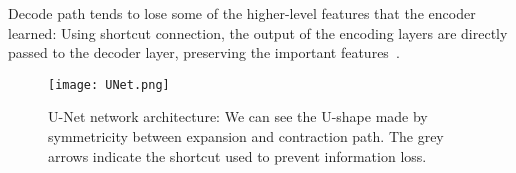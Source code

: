 \documentclass{standalone}
\begin{document}
	Decode path tends to lose some of the higher-level features that the encoder learned: Using shortcut connection, the output of the encoding layers are directly passed to the decoder layer, preserving the important features~\cite{PhDtheis}.
		
	\begin{figure}[h!]
		\centering
			\texttt{[image: UNet.png]}
		\caption{U-Net network architecture: We can see the U-shape made by symmetricity between expansion and contraction path. The grey arrows indicate the shortcut used to prevent information loss.}\label{fig:UNet}
	\end{figure}
	
		
	
\end{document}
